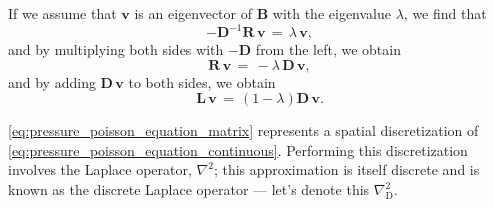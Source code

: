 If we assume that $\mathbf{v}$ is an eigenvector of $\mathbf{B}$ with the eigenvalue $\lambda$, we find that 
%
\begin{equation}
-\mathbf{D}^{-1}\mathbf{R}\,\mathbf{v} \,=\, \lambda\,\mathbf{v},
\end{equation}
%
and by multiplying both sides with $-\mathbf{D}$ from the left, we obtain
%
\begin{equation}
\mathbf{R}\,\mathbf{v} \,=\, -\lambda\,\mathbf{D}\,\mathbf{v},
\end{equation}
%
and by adding $\mathbf{D}\,\mathbf{v}$ to both sides, we obtain
%
\begin{equation} \label{eq:jacobian_error_eigenvector_equation}
\mathbf{L}\,\mathbf{v} \,=\, (1-\lambda)\mathbf{D}\,\mathbf{v}.
\end{equation}

\eqref{eq:pressure_poisson_equation_matrix} represents a spatial discretization of \eqref{eq:pressure_poisson_equation_continuous}. Performing this discretization involves \approximating the Laplace operator, $\nabla^2$; this approximation is itself discrete and is known as the discrete Laplace operator --- let's denote this $\nabla^2_{\text{D}}$.

